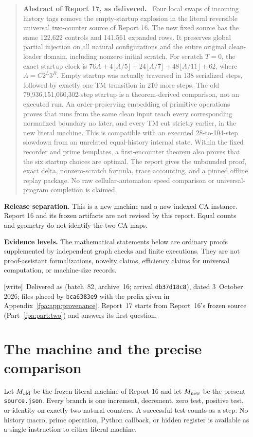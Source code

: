 \documentclass[11pt,a4paper]{article}
\numberwithin{equation}{section}
\newcommand{\code}[1]{\texttt{\small #1}}
\newcommand{\wtag}{\textup{[write]}}
\newenvironment{reportabstract}[1]{\begin{quote}\small\textbf{Abstract of Report #1, as delivered.}\ }{\end{quote}}
\begin{document}
\begin{reportabstract}{17}
Four local swaps of incoming history tags remove the empty-startup explosion
in the literal reversible universal two-counter source of Report 16. The new
fixed source has the same 122,622 controls and 141,561 expanded rows. It
preserves global partial injection on all natural configurations and the
entire original clean-loader domain, including nonzero initial scratch.
For scratch $T=0$, the exact startup clock is
$76A+4\lfloor A/5\rfloor+24\lfloor A/7\rfloor+48\lfloor A/11\rfloor+62$,
where $A=C2^L3^R$. Empty startup was actually traversed in 138 serialized
steps, followed by exactly one TM transition in 210 more steps. The old
79,936,151,060,302-step startup is a theorem-derived comparison, not an
executed run. An order-preserving embedding of primitive operations proves
that runs from the same clean input reach every corresponding normalized
boundary no later, and every TM cut strictly earlier, in the new literal
machine. This is compatible with an executed 28-to-104-step slowdown from
an unrelated equal-history internal state. Within the fixed recorder and prime templates, a first-encounter theorem
also proves that the six startup choices are optimal. The report gives the
unbounded proof, exact delta, nonzero-scratch formula, trace accounting, and a pinned
offline replay package. No raw cellular-automaton speed comparison or
universal-program completion is claimed.
\end{reportabstract}

\textbf{Release separation.} This is a new machine and a new indexed CA
instance. Report 16 and its frozen artifacts are not revised by this report.
Equal counts and geometry do not identify the two CA maps.

\textbf{Evidence levels.} The mathematical statements below are ordinary
proofs supplemented by independent graph checks and finite executions. They
are not proof-assistant formalizations, novelty claims, efficiency claims for
universal computation, or machine-size records.

\wtag\ Delivered as  (batch~82, archive~16; arrival \texttt{db37d18c8}), dated 3~October 2026; files placed by \texttt{bca6383e9} with the prefix given in Appendix~\ref{fpa:app:provenance}. Report~17 starts from Report~16's frozen source (Part~\ref{fpa:part:two}) and answers its first question.

\section{The machine and the precise comparison}\label{fpa:rep:17:first}
\label{fpa:st:sec:statement}
Let $M_{\rm old}$ be the frozen literal machine of Report 16 and let
$M_{\rm new}$ be the present \code{source.json}. Every branch is one
increment, decrement, zero test, positive test, or identity on exactly two
natural counters. A successful test counts as a step. No history macro,
prime operation, Python callback, or hidden register is available as a
single instruction to either literal machine.
\end{document}
